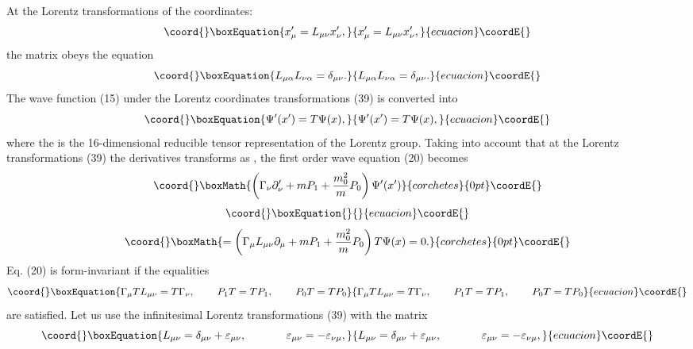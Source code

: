 \documentclass[a4paper,12pt]{article}
\begin{document}
At the Lorentz transformations of the coordinates:
\begin{equation}\coord{}\boxEquation{
x_\mu ^{\prime }=L_{\mu \nu }x_\nu ^{\prime } , \label{39}
}{
x_\mu ^{\prime }=L_{\mu \nu }x_\nu ^{\prime } , }{ecuacion}\coordE{}\end{equation}
the matrix \coordHE{} obeys the equation
\begin{equation}\coord{}\boxEquation{
L_{\mu \alpha }L_{\nu \alpha }=\delta _{\mu \nu } . \label{40}
}{
L_{\mu \alpha }L_{\nu \alpha }=\delta _{\mu \nu } . }{ecuacion}\coordE{}\end{equation}
The wave function (15) under the Lorentz coordinates
transformations (39) is converted into
\begin{equation}\coord{}\boxEquation{
\Psi ^{\prime }(x^{\prime })=T\Psi (x) , \label{41}
}{
\Psi ^{\prime }(x^{\prime })=T\Psi (x) , }{ecuacion}\coordE{}\end{equation}
where the \coordHE{} is the 16-dimensional reducible tensor
representation of the Lorentz group. Taking into account that at
the Lorentz transformations (39) the derivatives \myHighlight{$\partial _\mu $}\coordHE{}
transforms as \coordHE{}, the first order wave equation (20) becomes
\[\coord{}\boxMath{
\left( \Gamma _\nu \partial _\nu^{\prime }
+mP_1+\frac{m_0^2}{m}P_0\right) \Psi^{\prime } (x^{\prime
})
}{corchetes}{0pt}\coordE{}\]
\vspace{-7mm}
\begin{equation}\coord{}\boxEquation{
\label{42}
}{
}{ecuacion}\coordE{}\end{equation}
\vspace{-7mm}
\[\coord{}\boxMath{
=\left( \Gamma _\mu L_{\mu\nu}\partial _\mu
 +mP_1+\frac{m_0^2}{m}P_0\right)T\Psi (x)=0 .
}{corchetes}{0pt}\coordE{}\]
Eq. (20) is form-invariant if the equalities
\begin{equation}\coord{}\boxEquation{
\Gamma _\mu TL_{\mu \nu }=T\Gamma _\nu , \hspace{0.3in}P_1 T=TP_1
, \hspace{0.3in}P_0 T=TP_0 \label{43}
}{
\Gamma _\mu TL_{\mu \nu }=T\Gamma _\nu , \hspace{0.3in}P_1 T=TP_1
, \hspace{0.3in}P_0 T=TP_0 }{ecuacion}\coordE{}\end{equation}
are satisfied. Let us use the infinitesimal Lorentz
transformations (39) with the matrix
\begin{equation}\coord{}\boxEquation{
L_{\mu \nu }=\delta _{\mu \nu }+\varepsilon _{\mu \nu } ,
\hspace{0.5in} \varepsilon _{\mu \nu }=-\varepsilon _{\nu \mu } ,
\label{44}
}{
L_{\mu \nu }=\delta _{\mu \nu }+\varepsilon _{\mu \nu } ,
\hspace{0.5in} \varepsilon _{\mu \nu }=-\varepsilon _{\nu \mu } ,
}{ecuacion}\coordE{}\end{equation}
\end{document}
